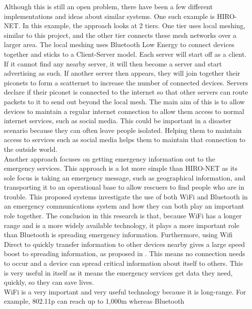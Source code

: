 \documentclass{report}
\begin{document}
Although this is still an open problem, there have been a few different implementations and ideas about similar systems. One such example is 
HIRO-NET\cite{ferranti2019hiro}. In this example, the approach looks at 2 tiers. One tier uses local meshing, similar to this project, 
and the other tier connects these mesh networks over a larger area. The local meshing uses Bluetooth Low Energy to connect 
devices together and sticks to a Client-Server model. Each server will start off as a client. If it cannot find any nearby server, it will then 
become a server and start advertising as such. If another server then appears, they will join together their piconets to form a scatternet 
to increase the number of connected devices. Servers declare if their piconet is connected to the internet so that other servers can route 
packets to it to send out beyond the local mesh. The main aim of this is to allow devices to maintain a regular internet connection to allow them 
access to normal internet services, such as social media. This could be important in a disaster scenario because they can often leave people isolated. 
Helping them to maintain access to services such as social media helps them to maintain that connection to the outside world.
\bigskip\\
Another approach focuses on getting emergency information out to the emergency services\cite{wu2011emergency, shahin2015alert}. This approach is a lot more simple than 
HIRO-NET as its sole focus is taking an emergency message, such as geographical information, and transporting it to an operational base to allow rescuers 
to find people who are in trouble. This proposed systems investigate the use of both WiFi and Bluetooth in an emergency communications system and how they 
can both play an important role together. The conclusion in this research is that, because WiFi has a longer range and is a more widely available technology, 
it plays a more important role than Bluetooth is spreading emergency information. Furthermore, using Wifi Direct to quickly transfer information to other devices 
nearby gives a large speed boost to spreading information, as proposed in \cite{shahin2015alert}. This means no connection needs to occur and a device can spread 
critical information about itself to others. This is very useful in itself as it means the emergency services get data they need, quickly, so they can save lives.
\bigskip\\
WiFi is a very important and very useful technology because it is long-range. For example, 802.11p can reach up to 1,000m \cite{abdelgader2014physical} whereas Bluetooth
\end{document}

